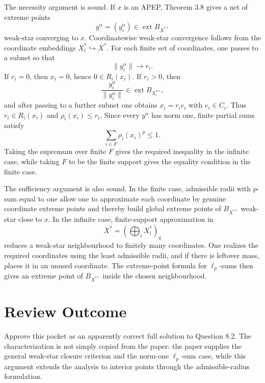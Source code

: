 \documentclass[11pt]{article}
\newcommand{\ext}{\operatorname{ext}}
\begin{document}
The necessity argument is sound.  If \(x\) is an APEP, Theorem 3.8 gives a
net of extreme points
\[
  y^\alpha=(y_i^\alpha)\in \ext B_{X^{**}}
\]
weak-star converging to \(x\).  Coordinatewise weak-star convergence follows
from the coordinate embeddings \(X_i^*\hookrightarrow X^*\).  For each finite
set of coordinates, one passes to a subnet so that
\[
  \|y_i^\alpha\|\to r_i.
\]
If \(r_i=0\), then \(x_i=0\), hence \(0\in R_i(x_i)\).  If \(r_i>0\), then
\[
  \frac{y_i^\alpha}{\|y_i^\alpha\|}
  \in \ext B_{X_i^{**}},
\]
and after passing to a further subnet one obtains \(x_i=r_i e_i\) with
\(e_i\in C_i\).  Thus \(r_i\in R_i(x_i)\) and
\(\rho_i(x_i)\leq r_i\).  Since every \(y^\alpha\) has norm one, finite
partial sums satisfy
\[
  \sum_{i\in F}\rho_i(x_i)^p\leq 1.
\]
Taking the supremum over finite \(F\) gives the required inequality in the
infinite case, while taking \(F\) to be the finite support gives the equality
condition in the finite case.

The sufficiency argument is also sound.  In the finite case, admissible radii
with \(p\)-sum equal to one allow one to approximate each coordinate by genuine
coordinate extreme points and thereby build global extreme points of
\(B_{X^{**}}\) weak-star close to \(x\).  In the infinite case, finite-support
approximation in
\[
  X^*=\left(\bigoplus_i X_i^*\right)_q
\]
reduces a weak-star neighbourhood to finitely many coordinates.  One realizes
the required coordinates using the least admissible radii, and if there is
leftover mass, places it in an unused coordinate.  The extreme-point formula
for \(\ell_p\)-sums then gives an extreme point of \(B_{X^{**}}\) inside the
chosen neighbourhood.

\section*{Review Outcome}

Approve this packet as an apparently correct full solution to Question 8.2.
The characterization is not simply copied from the paper: the paper supplies
the general weak-star closure criterion and the norm-one \(\ell_p\)-sum case,
while this argument extends the analysis to interior points through the
admissible-radius formulation.
\end{document}
